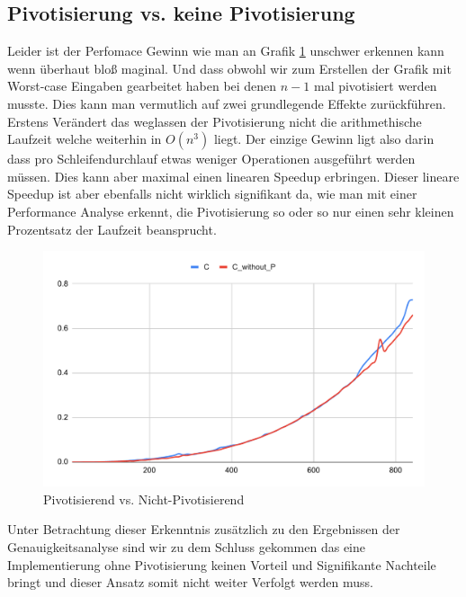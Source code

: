 \documentclass[course=erap]{aspdoc}
\begin{document}
\subsection{Pivotisierung vs. keine Pivotisierung}
Leider ist der Perfomace Gewinn wie man an Grafik \ref{PvsNP} unschwer erkennen kann wenn überhaut bloß maginal. Und dass obwohl wir zum Erstellen der Grafik mit Worst-case Eingaben gearbeitet haben bei denen $n-1$ mal pivotisiert werden musste.
 Dies kann man vermutlich auf zwei grundlegende Effekte zurückführen. Erstens Verändert das weglassen der Pivotisierung nicht die
 arithmethische Laufzeit welche weiterhin in $O(n^3)$ liegt. Der einzige Gewinn ligt also darin dass pro Schleifendurchlauf etwas weniger Operationen ausgeführt werden müssen. Dies kann aber maximal einen linearen Speedup erbringen. 
 Dieser lineare Speedup ist aber ebenfalls nicht wirklich signifikant da, wie man mit einer Performance Analyse erkennt, die Pivotisierung so oder so nur einen sehr kleinen Prozentsatz der Laufzeit beansprucht. 
 \begin{figure}[H]
 \begin{center}
 \caption{Pivotisierend vs. Nicht-Pivotisierend} 
  \label{PvsNP}
 \includegraphics[width = 0.8\linewidth]{PvsNP.pdf}

 
 \end{center}
\end{figure}
 Unter Betrachtung dieser Erkenntnis zusätzlich zu den Ergebnissen der Genauigkeitsanalyse sind wir zu dem Schluss gekommen das eine Implementierung ohne Pivotisierung keinen Vorteil und Signifikante Nachteile bringt und dieser
  Ansatz somit nicht weiter Verfolgt werden muss.
\end{document}
